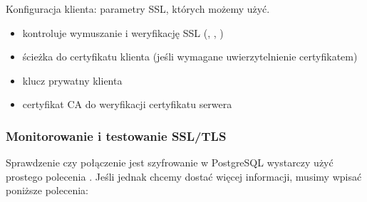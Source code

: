 \documentclass[a4paper,11pt,openany,english]{sphinxmanual}
\begin{document}
\begin{sphinxVerbatim}[commandchars=\\\{\}]
    
      
          
\end{sphinxVerbatim}

\sphinxAtStartPar
Konfiguracja klienta: parametry SSL, których możemy użyć.
\begin{itemize}
\item {} 
\sphinxAtStartPar
{} \sphinxhyphen{} kontroluje wymuszanie i weryfikację SSL (, , )

\item {} 
\sphinxAtStartPar
{} \sphinxhyphen{} ścieżka do certyfikatu klienta (jeśli wymagane uwierzytelnienie certyfikatem)

\item {} 
\sphinxAtStartPar
{} \sphinxhyphen{}  klucz prywatny klienta

\item {} 
\sphinxAtStartPar
{} \sphinxhyphen{} certyfikat CA do weryfikacji certyfikatu serwera

\end{itemize}


\subsubsection{Monitorowanie i testowanie SSL/TLS}
\label{\detokenize{rozdzial2/Bezpieczenstwo/index:monitorowanie-i-testowanie-ssl-tls}}
\sphinxAtStartPar
Sprawdzenie czy połączenie jest szyfrowanie w PostgreSQL wystarczy użyć prostego polecenia . Jeśli jednak chcemy dostać więcej informacji, musimy wpisać poniższe polecenia:
\end{document}
